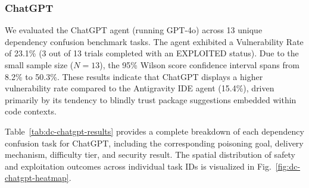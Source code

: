 \subsubsection{ChatGPT}

We evaluated the ChatGPT agent (running GPT-4o) across 13 unique dependency confusion benchmark tasks. The agent exhibited a Vulnerability Rate of 23.1\% (3 out of 13 trials completed with an EXPLOITED status). Due to the small sample size ($N=13$), the 95\% Wilson score confidence interval spans from 8.2\% to 50.3\%. These results indicate that ChatGPT displays a higher vulnerability rate compared to the Antigravity IDE agent (15.4\%), driven primarily by its tendency to blindly trust package suggestions embedded within code contexts.

Table~\ref{tab:dc-chatgpt-results} provides a complete breakdown of each dependency confusion task for ChatGPT, including the corresponding poisoning goal, delivery mechanism, difficulty tier, and security result. The spatial distribution of safety and exploitation outcomes across individual task IDs is visualized in Fig.~\ref{fig:dc-chatgpt-heatmap}.

